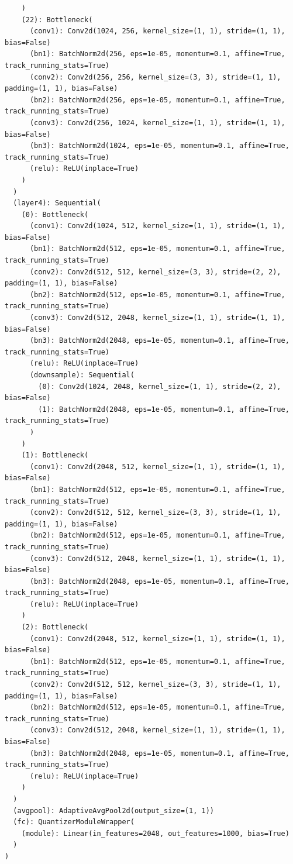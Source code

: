 \documentclass{article}
\begin{document}
\begin{verbatim}
    )
    (22): Bottleneck(
      (conv1): Conv2d(1024, 256, kernel_size=(1, 1), stride=(1, 1), bias=False)
      (bn1): BatchNorm2d(256, eps=1e-05, momentum=0.1, affine=True, track_running_stats=True)
      (conv2): Conv2d(256, 256, kernel_size=(3, 3), stride=(1, 1), padding=(1, 1), bias=False)
      (bn2): BatchNorm2d(256, eps=1e-05, momentum=0.1, affine=True, track_running_stats=True)
      (conv3): Conv2d(256, 1024, kernel_size=(1, 1), stride=(1, 1), bias=False)
      (bn3): BatchNorm2d(1024, eps=1e-05, momentum=0.1, affine=True, track_running_stats=True)
      (relu): ReLU(inplace=True)
    )
  )
  (layer4): Sequential(
    (0): Bottleneck(
      (conv1): Conv2d(1024, 512, kernel_size=(1, 1), stride=(1, 1), bias=False)
      (bn1): BatchNorm2d(512, eps=1e-05, momentum=0.1, affine=True, track_running_stats=True)
      (conv2): Conv2d(512, 512, kernel_size=(3, 3), stride=(2, 2), padding=(1, 1), bias=False)
      (bn2): BatchNorm2d(512, eps=1e-05, momentum=0.1, affine=True, track_running_stats=True)
      (conv3): Conv2d(512, 2048, kernel_size=(1, 1), stride=(1, 1), bias=False)
      (bn3): BatchNorm2d(2048, eps=1e-05, momentum=0.1, affine=True, track_running_stats=True)
      (relu): ReLU(inplace=True)
      (downsample): Sequential(
        (0): Conv2d(1024, 2048, kernel_size=(1, 1), stride=(2, 2), bias=False)
        (1): BatchNorm2d(2048, eps=1e-05, momentum=0.1, affine=True, track_running_stats=True)
      )
    )
    (1): Bottleneck(
      (conv1): Conv2d(2048, 512, kernel_size=(1, 1), stride=(1, 1), bias=False)
      (bn1): BatchNorm2d(512, eps=1e-05, momentum=0.1, affine=True, track_running_stats=True)
      (conv2): Conv2d(512, 512, kernel_size=(3, 3), stride=(1, 1), padding=(1, 1), bias=False)
      (bn2): BatchNorm2d(512, eps=1e-05, momentum=0.1, affine=True, track_running_stats=True)
      (conv3): Conv2d(512, 2048, kernel_size=(1, 1), stride=(1, 1), bias=False)
      (bn3): BatchNorm2d(2048, eps=1e-05, momentum=0.1, affine=True, track_running_stats=True)
      (relu): ReLU(inplace=True)
    )
    (2): Bottleneck(
      (conv1): Conv2d(2048, 512, kernel_size=(1, 1), stride=(1, 1), bias=False)
      (bn1): BatchNorm2d(512, eps=1e-05, momentum=0.1, affine=True, track_running_stats=True)
      (conv2): Conv2d(512, 512, kernel_size=(3, 3), stride=(1, 1), padding=(1, 1), bias=False)
      (bn2): BatchNorm2d(512, eps=1e-05, momentum=0.1, affine=True, track_running_stats=True)
      (conv3): Conv2d(512, 2048, kernel_size=(1, 1), stride=(1, 1), bias=False)
      (bn3): BatchNorm2d(2048, eps=1e-05, momentum=0.1, affine=True, track_running_stats=True)
      (relu): ReLU(inplace=True)
    )
  )
  (avgpool): AdaptiveAvgPool2d(output_size=(1, 1))
  (fc): QuantizerModuleWrapper(
    (module): Linear(in_features=2048, out_features=1000, bias=True)
  )
)
\end{verbatim}
\end{document}
